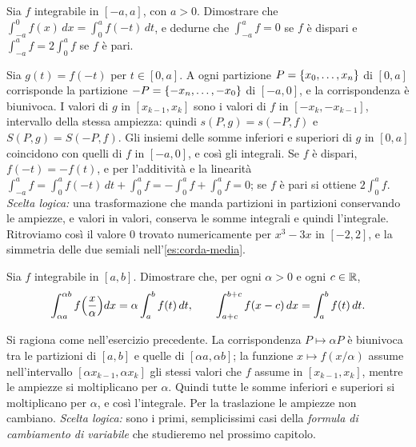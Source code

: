 \begin{esercizio}\label{es:riflessione}
Sia $f$ integrabile in $[-a,a]$, con $a>0$. Dimostrare che
$\int_{-a}^{0}f(x)\,dx=\int_{0}^{a}f(-t)\,dt$, e dedurne che
$\int_{-a}^{a}f=0$ se $f$ è dispari e $\int_{-a}^{a}f=2\int_{0}^{a}f$ se $f$ è pari.
\begin{soluzione}
Sia $g(t)=f(-t)$ per $t\in[0,a]$. A ogni partizione $P=\left\{ x_{0},\dots,x_{n} \right\}$ di
$[0,a]$ corrisponde la partizione $-P=\left\{ -x_{n},\dots,-x_{0} \right\}$ di $[-a,0]$, e la
corrispondenza è biunivoca. I valori di $g$ in $[x_{k-1},x_{k}]$ sono i valori di $f$ in
$[-x_{k},-x_{k-1}]$, intervallo della stessa ampiezza: quindi $s(P,g)=s(-P,f)$ e
$S(P,g)=S(-P,f)$. Gli insiemi delle somme inferiori e superiori di $g$ in $[0,a]$
coincidono con quelli di $f$ in $[-a,0]$, e così gli integrali. Se $f$ è dispari,
$f(-t)=-f(t)$, e per l'additività e la linearità
$\int_{-a}^{a}f=\int_{0}^{a}f(-t)\,dt+\int_{0}^{a}f=-\int_{0}^{a}f+\int_{0}^{a}f=0$; se $f$ è pari
si ottiene $2\int_{0}^{a}f$. \emph{Scelta logica:} una trasformazione che manda partizioni
in partizioni conservando le ampiezze, e valori in valori, conserva le somme integrali
e quindi l'integrale. Ritroviamo così il valore $0$ trovato numericamente per
$x^{3}-3x$ in $[-2,2]$, e la simmetria delle due semiali nell'\cref{es:corda-media}.
\end{soluzione}
\end{esercizio}

\begin{esercizio}\label{es:scala-traslazione}
Sia $f$ integrabile in $[a,b]$. Dimostrare che, per ogni $\alpha>0$ e ogni $c\in\mathbb{R}$,
\[
  \int_{\alpha a}^{\alpha b}f\Bigl(\frac x\alpha\Bigr)dx=\alpha\int_{a}^{b}f(t)\,dt, \qquad
  \int_{a+c}^{b+c}f(x-c)\,dx=\int_{a}^{b}f(t)\,dt .
\]
\begin{soluzione}
Si ragiona come nell'esercizio precedente. La corrispondenza $P\mapsto\alpha P$ è
biunivoca tra le partizioni di $[a,b]$ e quelle di $[\alpha a,\alpha b]$; la funzione
$x\mapsto f(x/\alpha)$ assume nell'intervallo $[\alpha x_{k-1},\alpha x_{k}]$ gli stessi
valori che $f$ assume in $[x_{k-1},x_{k}]$, mentre le ampiezze si moltiplicano per
$\alpha$. Quindi tutte le somme inferiori e superiori si moltiplicano per $\alpha$, e
così l'integrale. Per la traslazione le ampiezze non cambiano. \emph{Scelta logica:}
sono i primi, semplicissimi casi della \emph{formula di cambiamento di variabile} che
studieremo nel prossimo capitolo.
\end{soluzione}
\end{esercizio}

